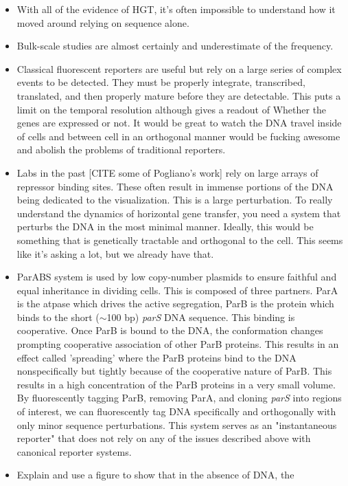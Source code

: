 \begin{itemize}
	\item With all of the evidence of HGT, it's often impossible to
		understand how it moved around relying on sequence alone. 
	\item Bulk-scale studies are almost certainly and underestimate of the
		frequency. 	
	\item Classical fluorescent reporters are useful but rely on a large
		series of complex events to be detected. They must be properly
		integrate, transcribed, translated, and then properly mature
		before they are detectable. This puts a limit on the temporal
		resolution although gives a readout of Whether the genes are
		expressed or not. It would be great to watch the DNA travel
		inside of cells and between cell in an orthogonal manner would
		be fucking awesome and abolish the problems of traditional reporters. 
	\item Labs in the past [CITE some of Pogliano's work] rely on large
		arrays of repressor binding sites. These often result in immense
		portions of the DNA being dedicated to the visualization. This
		is a large perturbation. To really understand the dynamics of
		horizontal gene transfer, you need a system that perturbs the
		DNA in the most minimal manner. Ideally, this would be something
		that is genetically tractable and orthogonal to the cell. This
		seems like it's asking a lot, but we already have that. 
	\item ParABS system is used by low copy-number plasmids to ensure
		faithful and equal inheritance in dividing cells. This is
		composed of three partners. ParA is the atpase which drives the
		active segregation, ParB is the protein which binds to the short
		($\sim$100 bp) \textit{parS} DNA sequence. This binding is
		cooperative. Once ParB is bound to the DNA, the conformation
		changes prompting cooperative association of other ParB
		proteins. This results in an effect called 'spreading' where the
		ParB proteins bind to the DNA nonspecifically but tightly because
		of the cooperative nature of ParB. This results in a high
		concentration of the ParB proteins in a very small volume. By
		fluorescently tagging ParB, removing ParA, and cloning
		\textit{parS} into regions of interest, we can fluorescently tag
		DNA specifically and orthogonally with only minor sequence
		perturbations. This system serves as an "instantaneous
		reporter" that does not rely on any of the issues described
		above with canonical reporter systems.
	\item Explain and use a figure to show that in the absence of DNA, the

\end{itemize}
